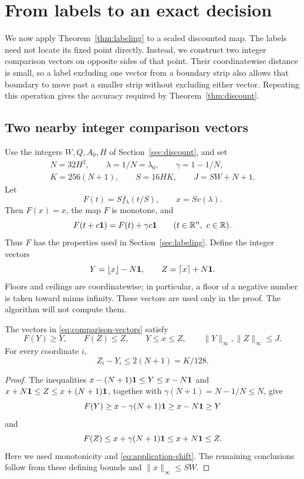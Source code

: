 \section{From labels to an exact decision}
\label{sec:application}

We now apply Theorem~\ref{thm:labeling} to a scaled discounted map.
The labels need not locate its fixed point directly. Instead, we construct
two integer comparison vectors on opposite sides of that point. Their
coordinatewise distance is small, so a label excluding one vector from a
boundary strip also allows that boundary to move past a smaller strip
without excluding either vector. Repeating this operation gives the
accuracy required by Theorem~\ref{thm:discount}.

\subsection{Two nearby integer comparison vectors}

Use the integers $W,Q,A_0,H$ of Section~\ref{sec:discount}, and set
\begin{equation}
\begin{gathered}
 N=32H^2,\qquad \lambda=1/N=\lambda_0,\qquad \gamma=1-1/N,\\
 K=256(N+1),\qquad S=16HK,\qquad J=SW+N+1.
\end{gathered}
\label{eq:application-parameters}
\end{equation}
Let
\[
 F(t)=S f_\lambda(t/S),\qquad x=S v(\lambda).
\]
Then $F(x)=x$, the map $F$ is monotone, and
\begin{equation}
 F(t+c\mathbf 1)=F(t)+\gamma c\mathbf 1\qquad(t\in\mathbb R^n,\ c\in\mathbb R).
\label{eq:application-shift}
\end{equation}
Thus $F$ has the properties used in Section~\ref{sec:labeling}.
Define the integer vectors
\begin{equation}
 Y=\lfloor x\rfloor-N\mathbf 1,
 \qquad Z=\lceil x\rceil+N\mathbf 1.
\label{eq:comparison-vectors}
\end{equation}
Floors and ceilings are coordinatewise; in particular, a floor of a
negative number is taken toward minus infinity. These vectors are used
only in the proof. The algorithm will not compute them.

\begin{lemma}
\label{lem:comparison-vectors}
The vectors in \eqref{eq:comparison-vectors} satisfy
\[
 F(Y)\ge Y,\qquad F(Z)\le Z,\qquad Y\le x\le Z,
 \qquad \|Y\|_\infty,\|Z\|_\infty\le J.
\]
For every coordinate $i$,
\begin{equation}
 Z_i-Y_i\le 2(N+1)=K/128.
\label{eq:comparison-gap}
\end{equation}
\end{lemma}
\begin{proof}
The inequalities
$x-(N+1)\mathbf 1\le Y\le x-N\mathbf 1$ and
$x+N\mathbf 1\le Z\le x+(N+1)\mathbf 1$, together with
$\gamma(N+1)=N-1/N\le N$, give
\[
 F(Y)\ge x-\gamma(N+1)\mathbf 1\ge x-N\mathbf 1\ge Y
\]
and
\[
 F(Z)\le x+\gamma(N+1)\mathbf 1\le x+N\mathbf 1\le Z.
\]
Here we used monotonicity and \eqref{eq:application-shift}.
The remaining conclusions follow from these defining bounds and
$\|x\|_\infty\le SW$.
\end{proof}

